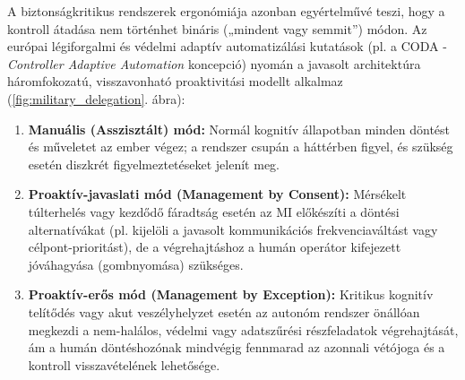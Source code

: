 \documentclass[12pt,a4paper,oneside]{book}
\begin{document}
A biztonságkritikus rendszerek ergonómiája azonban egyértelművé teszi, hogy a kontroll átadása nem történhet bináris („mindent vagy semmit”) módon. Az európai légiforgalmi és védelmi adaptív automatizálási kutatások (pl. a CODA - \emph{Controller Adaptive Automation} koncepció) nyomán a javasolt architektúra háromfokozatú, visszavonható proaktivitási modellt alkalmaz (\ref{fig:military_delegation}. ábra):
\begin{enumerate}
    \item \textbf{Manuális (Asszisztált) mód:} Normál kognitív állapotban minden döntést és műveletet az ember végez; a rendszer csupán a háttérben figyel, és szükség esetén diszkrét figyelmeztetéseket jelenít meg.
    \item \textbf{Proaktív-javaslati mód (Management by Consent):} Mérsékelt túlterhelés vagy kezdődő fáradtság esetén az MI előkészíti a döntési alternatívákat (pl. kijelöli a javasolt kommunikációs frekvenciaváltást vagy célpont-prioritást), de a végrehajtáshoz a humán operátor kifejezett jóváhagyása (gombnyomása) szükséges.
    \item \textbf{Proaktív-erős mód (Management by Exception):} Kritikus kognitív telítődés vagy akut veszélyhelyzet esetén az autonóm rendszer önállóan megkezdi a nem-halálos, védelmi vagy adatszűrési részfeladatok végrehajtását, ám a humán döntéshozónak mindvégig fennmarad az azonnali vétójoga és a kontroll visszavételének lehetősége.
\end{enumerate}
\end{document}
